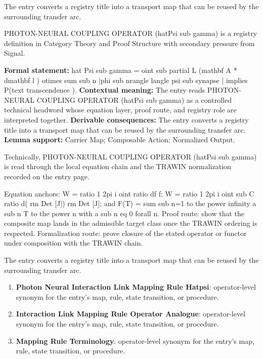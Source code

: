 The entry converts a registry title into a transport map that can be reused by the surrounding transfer arc.
\clearpage


\begingroup\small
{}
PHOTON-NEURAL COUPLING OPERATOR (hatPsi sub gamma) is a registry definition in Category Theory and Proof Structure with secondary pressure from Signal.

\begingroup\footnotesize\setlength{\emergencystretch}{3em}\sloppy
\textbf{Formal statement:} hat Psi sub gamma = oint sub partial L (mathbf A * dmathbf l ) otimes sum sub n |phi sub nrangle langle psi sub synapse | implies P(text transcendence ). \textbf{Contextual meaning:} The entry reads PHOTON-NEURAL COUPLING OPERATOR (hatPsi sub gamma) as a controlled technical headword whose equation layer, proof route, and registry role are interpreted together. \textbf{Derivable consequences:} The entry converts a registry title into a transport map that can be reused by the surrounding transfer arc. \textbf{Lemma support:} Carrier Map; Composable Action; Normalized Output.\par
\endgroup

Technically, PHOTON-NEURAL COUPLING OPERATOR (hatPsi sub gamma) is read through the local equation chain and the TRAWIN normalization recorded on the entry page.

Equation anchors: W = ratio 1 2pi i oint ratio df f; W = ratio 1 2pi i oint sub C ratio d( rm Det [J]) rm Det [J]; and F(T) = sum sub n=1 to the power infinity a sub n T to the power n with a sub n eq 0 forall n. Proof route: show that the composite map lands in the admissible target class once the TRAWIN ordering is respected. Formalization route: prove closure of the stated operator or functor under composition with the TRAWIN chain.

The entry converts a registry title into a transport map that can be reused by the surrounding transfer arc.
\endgroup

\begin{enumerate}[leftmargin=1.6em,itemsep=6pt,topsep=4pt]
\item \textbf{Photon Neural Interaction Link Mapping Rule Hatpsi}: operator-level synonym for the entry's map, rule, state transition, or procedure.
\item \textbf{Interaction Link Mapping Rule Operator Analogue}: operator-level synonym for the entry's map, rule, state transition, or procedure.
\item \textbf{Mapping Rule Terminology}: operator-level synonym for the entry's map, rule, state transition, or procedure.
\end{enumerate}

